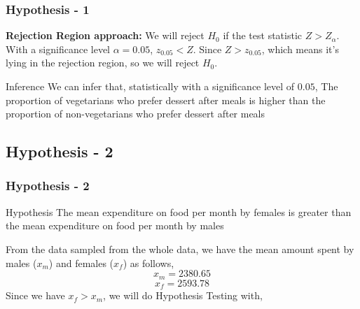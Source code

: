 \documentclass{beamer}
\begin{document}
\begin{frame}
\frametitle{Hypothesis - 1}
\textbf{Rejection Region approach:}
We will reject $H_0$ if the test statistic $Z > Z_{\alpha}$.
With a significance level $\alpha = 0.05$, $z_{0.05} < Z$.
Since $Z > z_{0.05}$, which means it's lying in the rejection region, so we will reject $H_0$.

\begin{block}{Inference} We can infer that, statistically with a significance level of $0.05$, The proportion of vegetarians who prefer dessert after meals is higher  than the proportion of non-vegetarians who prefer dessert after meals
 \end{block}

\end{frame}
\subsection{Hypothesis - 2}

\begin{frame}
    \frametitle{Hypothesis - 2}
    \begin{block}{Hypothesis}
       The mean expenditure on food per month by females is greater than the mean expenditure on food per month by males
    \end{block}
    From the data sampled from the whole data, we have the mean amount spent by males ($x_m$) and females ($x_f$) as follows,
    \[ x_m = 2380.65 \]
    \[ x_f = 2593.78 \]
    Since we have $x_f > x_m$, we will do Hypothesis Testing with,
\end{frame}
\end{document}
